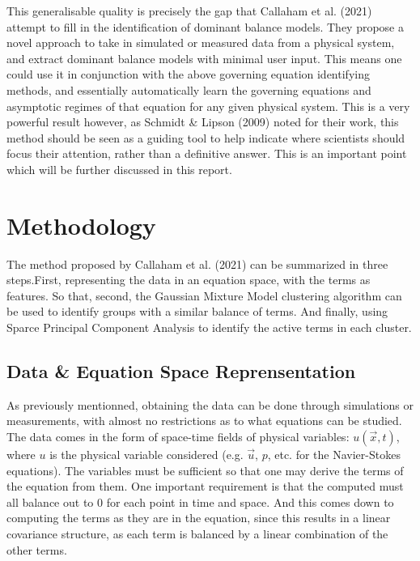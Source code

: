 \documentclass[12pt]{report} %
\begin{document}
\vspace{5mm}

This generalisable quality is precisely the gap that Callaham et al. (2021)\cite{callaham2021learning} attempt to fill in the identification of dominant balance models. They propose a novel approach to take in simulated or measured data from a physical system, and extract dominant balance models with minimal user input. This means one could use it in conjunction with the above governing equation identifying methods, and essentially automatically learn the governing equations and asymptotic regimes of that equation for any given physical system. This is a very powerful result however, as Schmidt \& Lipson (2009) noted for their work, this method should be seen as a guiding tool to help indicate where scientists should focus their attention, rather than a definitive answer. This is an important point which will be further discussed in this report.


\chapter{Methodology}

The method proposed by Callaham et al. (2021)\cite{callaham2021learning} can be summarized in three steps.First, representing the data in an equation space, with the terms as features. So that, second, the Gaussian Mixture Model clustering algorithm can be used to identify groups with a similar balance of terms. And finally, using Sparce Principal Component Analysis to identify the active terms in each cluster.

\section{Data \& Equation Space Reprensentation}

As previously mentionned, obtaining the data can be done through simulations or measurements, with almost no restrictions as to what equations can be studied. The data comes in the form of space-time fields of physical variables: $u(\vec{x}, t)$, where $u$ is the physical variable considered (e.g. $\vec{u}$, $p$, etc. for the Navier-Stokes equations). The variables must be sufficient so that one may derive the terms of the equation from them. One important requirement is that the computed must all balance out to 0 for each point in time and space. And this comes down to computing the terms as they are in the equation, since this results in a linear covariance structure, as each term is balanced by a linear combination of the other terms\cite[Supplementary Information]{callaham2021learning}.
\end{document}
